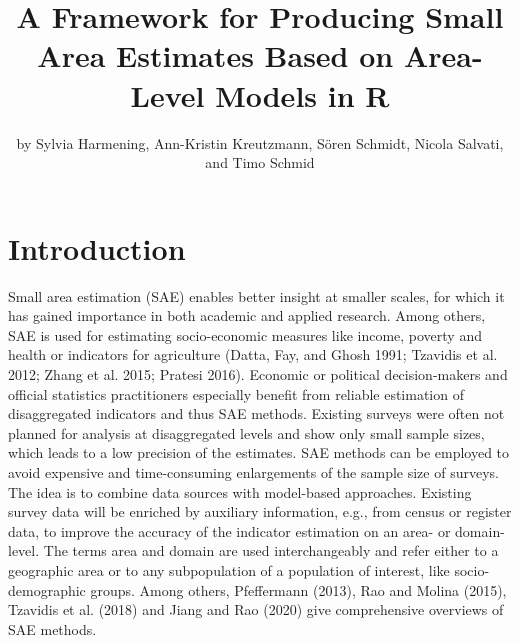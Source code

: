 \title{A Framework for Producing Small Area Estimates Based on Area-Level Models in R}


\author{by Sylvia Harmening, Ann-Kristin Kreutzmann, Sören Schmidt, Nicola Salvati, and Timo Schmid}

\maketitle


\hypertarget{sec:intro}{%
\section{Introduction}\label{sec:intro}}

Small area estimation (SAE) enables better insight at smaller scales,
for which it has gained importance in both academic and applied
research. Among others, SAE is used for estimating socio-economic
measures like income, poverty and health or indicators for agriculture
(Datta, Fay, and Ghosh 1991; Tzavidis et al. 2012; Zhang et al. 2015; Pratesi 2016). Economic or
political decision-makers and official statistics practitioners
especially benefit from reliable estimation of disaggregated indicators
and thus SAE methods. Existing surveys were often not planned for
analysis at disaggregated levels and show only small sample sizes, which
leads to a low precision of the estimates. SAE methods can be employed
to avoid expensive and time-consuming enlargements of the sample size of
surveys. The idea is to combine data sources with model-based
approaches. Existing survey data will be enriched by auxiliary
information, e.g., from census or register data, to improve the accuracy
of the indicator estimation on an area- or domain- level. The terms area
and domain are used interchangeably and refer either to a geographic
area or to any subpopulation of a population of interest, like
socio-demographic groups. Among others, Pfeffermann (2013), Rao and Molina (2015),
Tzavidis et al. (2018) and Jiang and Rao (2020) give comprehensive overviews of SAE
methods.

